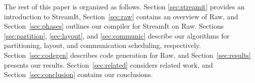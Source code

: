 
The rest of this paper is organized as follows.  Section
\ref{sec:streamit} provides an introduction to StreamIt,
Section~\ref{sec:raw} contains an overview of Raw, and
Section~\ref{sec:phases} outlines our compiler for StreamIt on Raw.
Sections \ref{sec:partition}, \ref{sec:layout}, and \ref{sec:communic}
describe our algorithms for partitioning, layout, and communication
scheduling, respectively.  Section~\ref{sec:codegen} describes code
generation for Raw, and Section~\ref{sec:results} presents our
results.  Section~\ref{sec:related} considers related work, and
Section~\ref{sec:conclusion} contains our conclusions.
